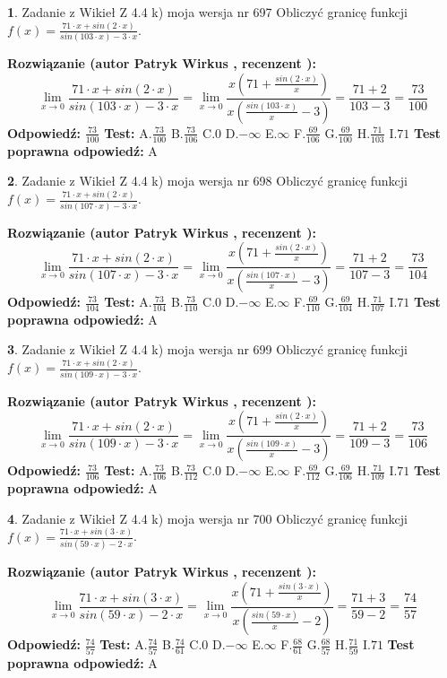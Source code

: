\documentclass[12pt, a4paper]{article}
\theoremstyle{definition} %
\newtheorem{zad}{}
\newcommand{\zadStart}[1]{\begin{zad}#1\newline}
\newcommand{\zadStop}{\end{zad}}
\newcommand{\rozwStart}[2]{\noindent \textbf{Rozwiązanie (autor #1 , recenzent #2): }\newline}
\newcommand{\rozwStop}{\newline}
\newcommand{\odpStart}{\noindent \textbf{Odpowiedź:}\newline}
\newcommand{\odpStop}{\newline}
\newcommand{\testStart}{\noindent \textbf{Test:}\newline}
\newcommand{\testStop}{\newline}
\newcommand{\kluczStart}{\noindent \textbf{Test poprawna odpowiedź:}\newline}
\newcommand{\kluczStop}{\newline}
\begin{document}
\zadStart{Zadanie z Wikieł Z 4.4 k) moja wersja nr 697}
Obliczyć granicę funkcji $f(x)=\frac{71\cdot x +sin(2\cdot x)}{sin(103\cdot x) -3\cdot x}$.
\zadStop
\rozwStart{Patryk Wirkus}{}
$$\lim\limits_{x\to 0}\frac{71\cdot x +sin(2\cdot x)}{sin(103\cdot x) -3\cdot x}
=\lim\limits_{x\to 0}\frac{x(71+\frac{sin(2\cdot x)}{x})}{x(\frac{sin(103\cdot x)}{x}-3)}
=\frac{71+2}{103-3} = \frac{73}{100}$$
\rozwStop
\odpStart
$\frac{73}{100}$
\odpStop
\testStart
A.$\frac{73}{100}$
B.$\frac{73}{106}$
C.$0$
D.$-\infty$
E.$\infty$
F.$\frac{69}{106}$
G.$\frac{69}{100}$
H.$\frac{71}{103}$
I.$71$
\testStop
\kluczStart
A
\kluczStop



\zadStart{Zadanie z Wikieł Z 4.4 k) moja wersja nr 698}
Obliczyć granicę funkcji $f(x)=\frac{71\cdot x +sin(2\cdot x)}{sin(107\cdot x) -3\cdot x}$.
\zadStop
\rozwStart{Patryk Wirkus}{}
$$\lim\limits_{x\to 0}\frac{71\cdot x +sin(2\cdot x)}{sin(107\cdot x) -3\cdot x}
=\lim\limits_{x\to 0}\frac{x(71+\frac{sin(2\cdot x)}{x})}{x(\frac{sin(107\cdot x)}{x}-3)}
=\frac{71+2}{107-3} = \frac{73}{104}$$
\rozwStop
\odpStart
$\frac{73}{104}$
\odpStop
\testStart
A.$\frac{73}{104}$
B.$\frac{73}{110}$
C.$0$
D.$-\infty$
E.$\infty$
F.$\frac{69}{110}$
G.$\frac{69}{104}$
H.$\frac{71}{107}$
I.$71$
\testStop
\kluczStart
A
\kluczStop



\zadStart{Zadanie z Wikieł Z 4.4 k) moja wersja nr 699}
Obliczyć granicę funkcji $f(x)=\frac{71\cdot x +sin(2\cdot x)}{sin(109\cdot x) -3\cdot x}$.
\zadStop
\rozwStart{Patryk Wirkus}{}
$$\lim\limits_{x\to 0}\frac{71\cdot x +sin(2\cdot x)}{sin(109\cdot x) -3\cdot x}
=\lim\limits_{x\to 0}\frac{x(71+\frac{sin(2\cdot x)}{x})}{x(\frac{sin(109\cdot x)}{x}-3)}
=\frac{71+2}{109-3} = \frac{73}{106}$$
\rozwStop
\odpStart
$\frac{73}{106}$
\odpStop
\testStart
A.$\frac{73}{106}$
B.$\frac{73}{112}$
C.$0$
D.$-\infty$
E.$\infty$
F.$\frac{69}{112}$
G.$\frac{69}{106}$
H.$\frac{71}{109}$
I.$71$
\testStop
\kluczStart
A
\kluczStop



\zadStart{Zadanie z Wikieł Z 4.4 k) moja wersja nr 700}
Obliczyć granicę funkcji $f(x)=\frac{71\cdot x +sin(3\cdot x)}{sin(59\cdot x) -2\cdot x}$.
\zadStop
\rozwStart{Patryk Wirkus}{}
$$\lim\limits_{x\to 0}\frac{71\cdot x +sin(3\cdot x)}{sin(59\cdot x) -2\cdot x}
=\lim\limits_{x\to 0}\frac{x(71+\frac{sin(3\cdot x)}{x})}{x(\frac{sin(59\cdot x)}{x}-2)}
=\frac{71+3}{59-2} = \frac{74}{57}$$
\rozwStop
\odpStart
$\frac{74}{57}$
\odpStop
\testStart
A.$\frac{74}{57}$
B.$\frac{74}{61}$
C.$0$
D.$-\infty$
E.$\infty$
F.$\frac{68}{61}$
G.$\frac{68}{57}$
H.$\frac{71}{59}$
I.$71$
\testStop
\kluczStart
A
\kluczStop
\end{document}
